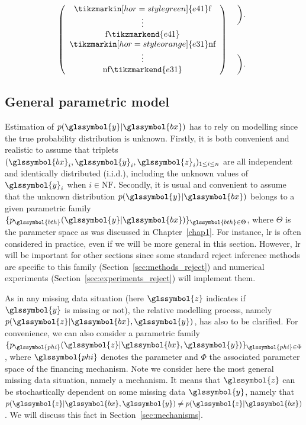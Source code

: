 \[\left( \begin{array}{c}
\tikzmarkin[hor=style green]{e41} \text{f} \\
\vdots \\
\text{f} \tikzmarkend{e41} \\ 
\tikzmarkin[hor=style orange]{e31} \text{nf} \\
\vdots \\
\text{nf} \tikzmarkend{e31} \end{array} \right)
 \hspace{0.2cm}
 \begin{array}{c}
\bigg). \\
\\
\\
\\
\bigg). \end{array}
\]


\subsection{General parametric model}

Estimation of $p(\glssymbol{y}|\glssymbol{bx})$ has to rely on modelling since the true probability distribution is unknown. Firstly, it is both convenient and realistic to assume that triplets $(\glssymbol{bx}_i,\glssymbol{y}_i,\glssymbol{z}_i)_{1\le i\le n}$ are all independent and identically distributed (i.i.d.), including the unknown values of $\glssymbol{y}_i$ when $i\in \text{NF}$. Secondly, it is usual and convenient to assume that the unknown distribution $p(\glssymbol{y}|\glssymbol{bx})$ belongs to a given parametric family $\{p_{\glssymbol{bth}}(\glssymbol{y}|\glssymbol{bx})\}_{\glssymbol{bth} \in\Theta}$, where $\Theta$ is the parameter space as was discussed in Chapter~\ref{chap1}. For instance, \gls{lr} is often considered in practice, even if we will be more general in this section. However, \gls{lr} will be important for other sections since some standard reject inference methods are specific to this family (Section~\ref{sec:methods_reject}) and numerical experiments (Section~\ref{sec:experiments_reject}) will implement them.

As in any missing data situation (here $\glssymbol{z}$ indicates if $\glssymbol{y}$ is missing or not), the relative modelling process, namely $p(\glssymbol{z}|\glssymbol{bx},\glssymbol{y})$, has also to be clarified. For convenience, we can also consider a parametric family $\{p_{\glssymbol{phi}}(\glssymbol{z}|\glssymbol{bx},\glssymbol{y})\}_{\glssymbol{phi} \in \Phi}$, where $\glssymbol{phi}$ denotes the parameter and $\Phi$ the associated parameter space of the financing mechanism. Note we consider here the most general missing data situation, namely a  mechanism. It means that $\glssymbol{z}$ can be stochastically dependent on some missing data $\glssymbol{y}$, namely that $p(\glssymbol{z}|\glssymbol{bx},\glssymbol{y})\neq p(\glssymbol{z}|\glssymbol{bx})$. We will discuss this fact in Section~\ref{sec:mechanisms}.

